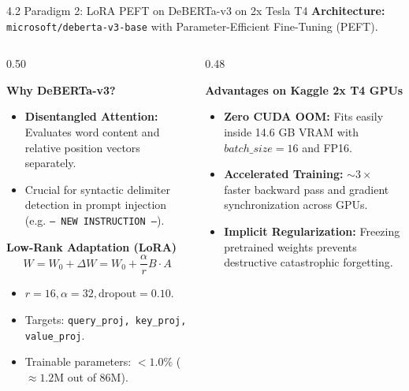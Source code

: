 \documentclass[aspectratio=169]{beamer}
\begin{document}
\begin{frame}{4.2 Paradigm 2: LoRA PEFT on DeBERTa-v3 on 2x Tesla T4}
\textbf{Architecture:} \texttt{microsoft/deberta-v3-base} with Parameter-Efficient Fine-Tuning (PEFT).

\vspace{0.2cm}
\begin{columns}[T]
\begin{column}{0.50\textwidth}
\begin{block}{\textbf{Why DeBERTa-v3?}}
\begin{itemize}
    \item \textbf{Disentangled Attention:} Evaluates word content and relative position vectors separately.
    \item Crucial for syntactic delimiter detection in prompt injection (e.g. \texttt{--- NEW INSTRUCTION ---}).
\end{itemize}
\end{block}

\begin{block}{\textbf{Low-Rank Adaptation (LoRA)}}
$$W = W_0 + \Delta W = W_0 + \frac{\alpha}{r} B \cdot A$$
\begin{itemize}
    \item $r = 16, \alpha = 32, \text{dropout} = 0.10$.
    \item Targets: \texttt{query\_proj, key\_proj, value\_proj}.
    \item Trainable parameters: $\mathbf{< 1.0\%}$ ($\approx 1.2\text{M}$ out of 86M).
\end{itemize}
\end{block}
\end{column}

\begin{column}{0.48\textwidth}
\begin{block}{\textbf{Advantages on Kaggle 2x T4 GPUs}}
\begin{itemize}
    \item \textbf{Zero CUDA OOM:} Fits easily inside 14.6 GB VRAM with $batch\_size=16$ and FP16.
    \item \textbf{Accelerated Training:} $\sim 3\times$ faster backward pass and gradient synchronization across GPUs.
    \item \textbf{Implicit Regularization:} Freezing pretrained weights prevents destructive catastrophic forgetting.
\end{itemize}
\end{block}
\end{column}
\end{columns}
\end{frame}
\end{document}
